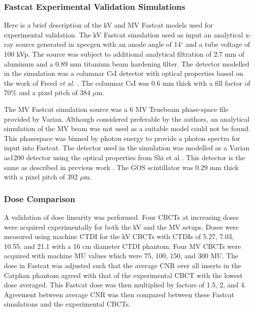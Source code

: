 \label{chapter:appendix}

\subsubsection{Fastcat Experimental Validation Simulations}

Here is a brief description of the kV and MV Fastcat models used for experimental validation. The kV Fastcat simulation used as input an analytical x-ray source generated in xpecgen \cite{Hernandez2016Xpecgen:Anodes} with an anode angle of 14$^{\circ}$ and a tube voltage of 100 kVp. The source was subject to additional analytical filtration of 2.7 mm of aluminum and a 0.89 mm titanium beam hardening filter. The detector modelled in the simulation was a columnar CsI detector with optical properties based on the work of Freed \textit{et al.} \cite{Freed2009ExperimentalScreens}. The columnar CsI was 0.6 mm thick with a fill factor of 70\% and a pixel pitch of 384 $\mu$m.



The MV Fastcat simulation source was a 6 MV Truebeam phase-space file provided by Varian. Although considered preferable by the authors, an analytical simulation of the MV beam was not used as a suitable model could not be found. This phasespace was binned by photon energy to provide a photon spectra for input into Fastcat. The detector used in the simulation was modelled as a Varian as1200 detector using the optical properties from Shi et al \cite{Shi2018APerformance}. This detector is the same as described in previous work \cite{OConnell2021FastCAT:Simulation}. The GOS scintillator was 0.29 mm thick with a pixel pitch of 392 $\mu$m.

\subsubsection{Dose Comparison}

A validation of dose linearity was performed. Four CBCTs at increasing doses were acquired experimentally for both the kV and the MV setups. Doses were measured using machine CTDI for the kV CBCTs with CTDIs of 5.27, 7.03, 10.55, and 21.1 with a 16 cm diameter CTDI phantom. Four MV CBCTs were acquired with machine MU values which were 75, 100, 150, and 300 MU. The dose in Fastcat was adjusted such that the average CNR over all inserts in the Catphan phantom agreed with that of the experimental CBCT with the lowest dose averaged. This Fastcat dose was then multiplied by factors of 1.5, 2, and 4. Agreement between average CNR was then compared between these Fastcat simulations and the experimental CBCTs.

